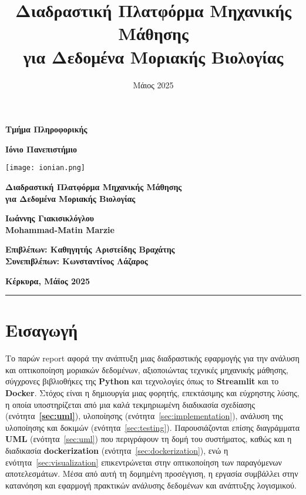 \documentclass{article}  %
\title{Διαδραστική Πλατφόρμα Μηχανικής Μάθησης \\ για Δεδομένα Μοριακής Βιολογίας}
\date{Μάιος 2025}
\begin{document}
\begin{titlepage}
\pagestyle{plain}
    \centering
    \vspace*{1cm}
    {\bfseries\LARGE Τμήμα Πληροφορικής \par}
    \vspace{0.5cm}
    {\bfseries\Large Ιόνιο Πανεπιστήμιο \par}
    \vspace{2cm}
    \texttt{[image: ionian.png]}\par\vspace{1cm}
    {\bfseries\Huge Διαδραστική Πλατφόρμα Μηχανικής Μάθησης \\ για Δεδομένα Μοριακής Βιολογίας\par}
    \vspace{2cm}
    {\bfseries\Large Ιωάννης Γιακισικλόγλου \\  {Mohammad-Matin Marzie}\par}
    \vspace{2cm}
    {\bfseries Επιβλέπων: Καθηγητής Αριστείδης Βραχάτης \\ Συνεπιβλέπων: Κωνσταντίνος Λάζαρος\par}
    \vfill
    {\bfseries\large Κέρκυρα, Μάϊος 2025}
\end{titlepage}

\newpage
\tableofcontents
\newpage

\noindent\rule{\linewidth}{0.4pt}
\section{Εισαγωγή}

Το παρών report αφορά την ανάπτυξη μιας διαδραστικής εφαρμογής για την ανάλυση και οπτικοποίηση μοριακών δεδομένων, αξιοποιώντας τεχνικές μηχανικής μάθησης, σύγχρονες βιβλιοθήκες της \textbf{Python} και τεχνολογίες όπως το \textbf{Streamlit} και το \textbf{Docker}. Στόχος είναι η δημιουργία μιας φορητής, επεκτάσιμης και εύχρηστης λύσης, η οποία υποστηρίζεται από μια καλά τεκμηριωμένη διαδικασία σχεδίασης (ενότητα~\textbf{\ref{sec:uml}}), υλοποίησης (ενότητα~\ref{sec:implementation}), ανάλυση της υλοποίησης και δοκιμών (ενότητα~\ref{sec:testing}). Παρουσιάζονται επίσης διαγράμματα \textbf{UML} (ενότητα~\ref{sec:uml}) που περιγράφουν τη δομή του συστήματος, καθώς και η διαδικασία \textbf{dockerization} (ενότητα~\ref{sec:dockerization}), ενώ η ενότητα~\ref{sec:visualization} επικεντρώνεται στην οπτικοποίηση των παραγόμενων αποτελεσμάτων. Μέσα από αυτή τη δομημένη προσέγγιση, η εργασία συμβάλλει στην κατανόηση και εφαρμογή πρακτικών ανάλυσης δεδομένων και ανάπτυξης λογισμικού.
\end{document}
